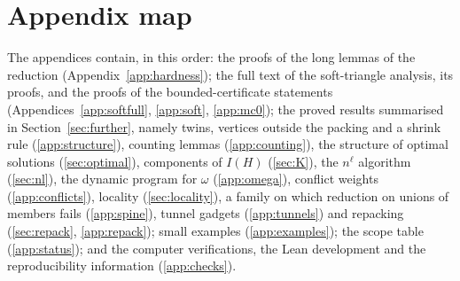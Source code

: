 \documentclass[11pt]{article}
\theoremstyle{definition}
\theoremstyle{remark}
\begin{document}
\section*{Appendix map}
The appendices contain, in this order: the proofs of the long lemmas of the reduction (Appendix~\ref{app:hardness}); the full text of the soft-triangle analysis, its proofs, and the proofs of the bounded-certificate statements (Appendices~\ref{app:softfull}, \ref{app:soft}, \ref{app:mc0}); the proved results summarised in Section~\ref{sec:further}, namely twins, vertices outside the packing and a shrink rule (\ref{app:structure}), counting lemmas (\ref{app:counting}), the structure of optimal solutions (\ref{sec:optimal}), components of $I(H)$ (\ref{sec:K}), the $n^{\ell}$ algorithm (\ref{sec:nl}), the dynamic program for $\omega$ (\ref{app:omega}), conflict weights (\ref{app:conflicts}), locality (\ref{sec:locality}), a family on which reduction on unions of members fails (\ref{app:spine}), tunnel gadgets (\ref{app:tunnels}) and repacking (\ref{sec:repack}, \ref{app:repack}); small examples (\ref{app:examples}); the scope table (\ref{app:status}); and the computer verifications, the Lean development and the reproducibility information (\ref{app:checks}).



















\end{document}

